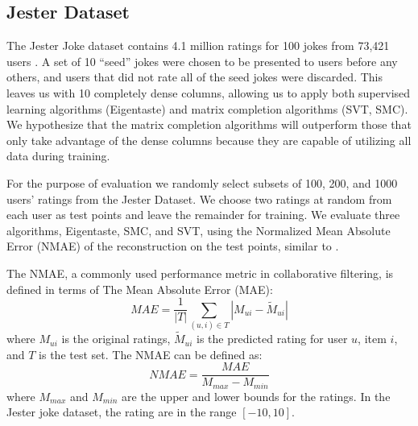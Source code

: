 \documentclass{article} %
\begin{document}
\subsection{Jester Dataset}

The Jester Joke dataset contains 4.1 million ratings for 100 jokes
from 73,421 users \cite{r30}. A set of 10 ``seed'' jokes were chosen
to be presented to users before any others, and users that did not
rate all of the seed jokes were discarded. This leaves us with 10
completely dense columns, allowing us to apply both supervised
learning algorithms (Eigentaste) and matrix completion algorithms
(SVT, SMC). We hypothesize that the matrix completion algorithms will
outperform those that only take advantage of the dense columns because
they are capable of utilizing all data during training.

For the purpose of evaluation we randomly select subsets of 100, 200,
and 1000 users' ratings from the Jester Dataset. We choose two ratings
at random from each user as test points and leave the remainder for
training. We evaluate three algorithms, Eigentaste, SMC, and SVT,
using the Normalized Mean Absolute Error (NMAE) of the reconstruction
on the test points, similar to \cite{oh2010thesis}.

The NMAE, a commonly used performance metric in collaborative
filtering, is defined in terms of The Mean Absolute Error (MAE):
\begin{equation}
MAE = \frac{1}{|T|}\sum\limits_{(u,i) \in T} |M_{ui} - \widetilde{M}_{ui}|
\end{equation}
where $M_{ui}$ is the original ratings, $\widetilde{M}_{ui}$ is the predicted rating for user $u$, item $i$, and $T$ is the test set. The NMAE can be defined as:
\begin{equation}
NMAE = \frac{MAE}{M_{max}-M_{min}}
\end{equation}
where $M_{max}$ and $M_{min}$ are the upper and lower bounds for the
ratings. In the Jester joke dataset, the rating are in the range
$[-10,10]$.

\end{document}
